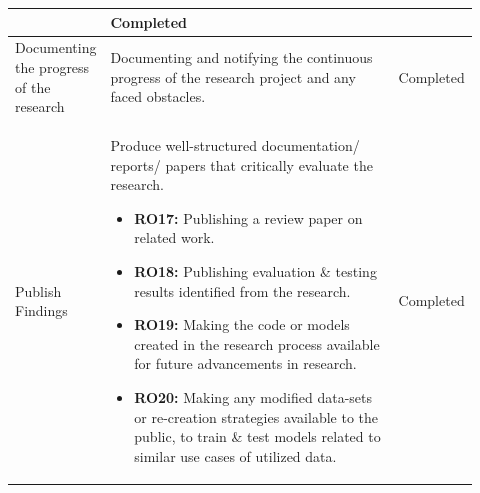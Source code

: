 \begin{longtable}{| p{0.135\linewidth} | p{0.63\linewidth}| p{0.15\linewidth}|}
\begin{itemize}
\end{itemize}
&
Completed\\
\hline
Documenting the progress of the research & Documenting and notifying the continuous progress of the research project and any faced obstacles. 
&
Completed\\
\hline
Publish Findings & Produce well-structured documentation/ reports/ papers that critically evaluate the research.
\begin{itemize}
\item \textbf{RO17:} Publishing a review paper on related work.
\item \textbf{RO18:} Publishing evaluation \& testing results identified from the research.
\item \textbf{RO19:} Making the code or models created in the research process available for future advancements in research.
\item \textbf{RO20:} Making any modified data-sets or re-creation strategies available to the public, to train \& test models related to similar use cases of utilized data.
\vspace{-7mm}       %
\end{itemize}
&
Completed\\
\hline
\end{longtable}


